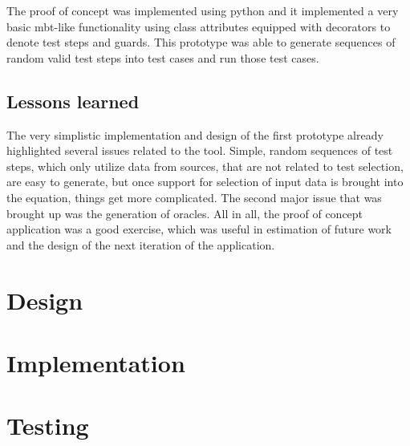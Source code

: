 The proof of concept was implemented using python and it implemented a very basic mbt-like functionality using class attributes equipped with decorators to denote test steps and guards. This prototype was able to generate sequences of random valid test steps into test cases and run those test cases.

\subsection{Lessons learned}
The very simplistic implementation and design of the first prototype already highlighted several issues related to the tool. Simple, random sequences of test steps, which only utilize data from sources, that are not related to test selection, are easy to generate, but once support for selection of input data is brought into the equation, things get more complicated. The second major issue that was brought up was the generation of oracles. All in all, the proof of concept application was a good exercise, which was useful in estimation of future work and the design of the next iteration of the application. 


\section{Design}

\section{Implementation}

\section{Testing}